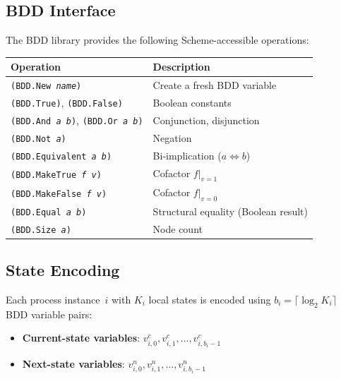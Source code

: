 \documentclass[11pt]{article}
\begin{document}
\subsection{BDD Interface}

The BDD library provides the following Scheme-accessible operations:

\begin{center}
\begin{tabular}{ll}
\toprule
\textbf{Operation} & \textbf{Description} \\
\midrule
\texttt{(BDD.New \textit{name})} & Create a fresh BDD variable \\
\texttt{(BDD.True)}, \texttt{(BDD.False)} & Boolean constants \\
\texttt{(BDD.And \textit{a b})}, \texttt{(BDD.Or \textit{a b})} & Conjunction, disjunction \\
\texttt{(BDD.Not \textit{a})} & Negation \\
\texttt{(BDD.Equivalent \textit{a b})} & Bi-implication ($a \Leftrightarrow b$) \\
\texttt{(BDD.MakeTrue \textit{f v})} & Cofactor $f|_{v=1}$ \\
\texttt{(BDD.MakeFalse \textit{f v})} & Cofactor $f|_{v=0}$ \\
\texttt{(BDD.Equal \textit{a b})} & Structural equality (Boolean result) \\
\texttt{(BDD.Size \textit{a})} & Node count \\
\bottomrule
\end{tabular}
\end{center}

\subsection{State Encoding}

Each process instance~$i$ with $K_i$ local states is encoded using
$b_i = \lceil \log_2 K_i \rceil$ BDD variable pairs:

\begin{itemize}
\item \textbf{Current-state variables}: $v^c_{i,0}, v^c_{i,1}, \ldots, v^c_{i,b_i-1}$
\item \textbf{Next-state variables}: $v^n_{i,0}, v^n_{i,1}, \ldots, v^n_{i,b_i-1}$
\end{itemize}
\end{document}
